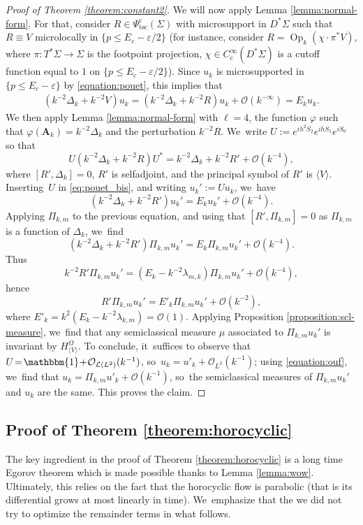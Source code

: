 \documentclass[JEP,XML,SOM,Unicode,published]{cedram}
\newcommand{\bA}{\boldsymbol{A}}
\theoremstyle{plain}
\theoremstyle{definition}
\let\mc\mathcal
\let\eps\varepsilon
\DeclareMathOperator{\comp}{c}
\DeclareMathOperator{\Op}{Op}
\begin{document}
\begin{proof}[Proof of Theorem \ref{theorem:constant2}]
We will now apply Lemma \ref{lemma:normal-form}. For that, consider $R \in \Psi^{\comp}_{\mathrm{tsc}}(\Sigma)$ with microsupport in $D^*\Sigma$ such that $R \equiv V$ microlocally in $\{p \leq E_c-\eps/2\}$ (for instance, consider $R = \Op_k(\chi \cdot \pi^*V)$, where $\pi : T^*\Sigma \to \Sigma$ is the footpoint projection, $\chi \in C^\infty_{\comp}(D^*\Sigma)$ is a cutoff function equal to $1$ on $\{p \leq E_c-\eps/2\}$). Since $u_k$ is microsupported in $\{p \leq E_c-\eps\}$ by \eqref{equation:pouet}, this implies that
\begin{gather} \label{eq:pouet_bis}
(k^{-2}\Delta_k + k^{-2}V) u_k = (k^{-2}\Delta_k + k^{-2}R) u_k +
\mc{O}(k^{-\infty}) = E_k u_k.
\end{gather}
We then apply Lemma \ref{lemma:normal-form} with $\ell=4$, the function $\varphi$ such that $\varphi(\bA_k) = k^{-2}\Delta_k$ and the perturbation $k^{-2}R$. We~write
$U :=
e^{ih^2S_2}e^{ihS_1}e^{iS_0}$ so that
\[
U(k^{-2}\Delta_k + k^{-2}R)U^* = k^{-2}
\Delta_k + k^{-2}R' + \mc{O}(k^{-4}),
\]
where $[R', \Delta_k]=0$, $R'$ is
selfadjoint, and the principal symbol of $R'$ is $\langle V \rangle$.
Inserting~$U$ in \eqref{eq:pouet_bis}, and writing $u_k' := U u_k$, we~have
\[
(k^{-2} \Delta_k + k^{-2}R') u_k' = E_k u_k' + \mc{O} (k^{-4}).
\]
Applying $\Pi_{k,m}$ to the previous equation, and using that $[R',\Pi_{k,m}] = 0$ as $\Pi_{k,m}$ is a function of $\Delta_k$, we~find
\[
(k^{-2} \Delta_k + k^{-2}R') \Pi_{k,m} u_k' = E_k \Pi_{k,m} u_k' + \mc{O}
(k^{-4}).
\]
Thus
\[
k^{-2}R' \Pi_{k,m} u_k' = (E_k - k^{-2} \lambda_{m,k}) \Pi_{k,m} u_k' + \mc{O}
(k^{-4}),
\]
hence
\[
R' \Pi_{k,m}u_k' = E'_k \Pi_{k,m} u_k' + \mc{O} (k^{-2}),
\]
where $E'_k = k^{2} (E_k - k^{-2} \lambda_{k,m}) = \mc{O}(1)$.
Applying Proposition \ref{proposition:scl-measure}, we~find that any semiclassical measure $\mu$ associated to $\Pi_{k,m} u_k'$ is invariant by $H^{\Omega}_{\langle V \rangle}$. To conclude, it~suffices to observe that~\hbox{$U \!=\! \mathbbm{1} \!+\! \mc{O}_{\mc{L}(L^2)}(k^{-1})$}, so~$u_k = u'_k + \mc{O}_{L^2}(k^{-1})$; using \eqref{equation:ouf}, we~find that $u_k = \Pi_{k,m} u'_k +\mc{O}(k^{-1})$, so~the semiclassical measures of $\Pi_{k,m} u_k'$ and $u_k$ are the same. This proves the claim.
\end{proof}

\subsection{Proof of Theorem \ref{theorem:horocyclic}} The key ingredient in the proof of Theorem \ref{theorem:horocyclic} is a long time Egorov theorem which is made possible thanks to Lemma \ref{lemma:wow}. Ultimately, this relies on the fact that the horocyclic flow is parabolic (that is its differential grows at most linearly in time). We~emphasize that the we did not try to optimize the remainder terms in what follows.
\end{document}
